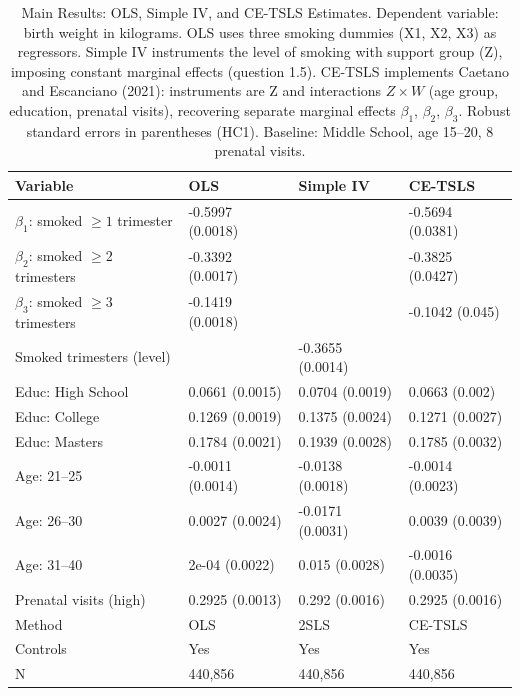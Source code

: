 \begin{table}[ht]
\centering
\caption{Main Results: OLS, Simple IV, and CE-TSLS Estimates. Dependent variable: birth weight in kilograms. OLS uses three smoking dummies (X1, X2, X3) as regressors. Simple IV instruments the level of smoking with support group (Z), imposing constant marginal effects (question 1.5). CE-TSLS implements Caetano and Escanciano (2021): instruments are Z and interactions $Z \times W$ (age group, education, prenatal visits), recovering separate marginal effects $\beta_1$, $\beta_2$, $\beta_3$. Robust standard errors in parentheses (HC1). Baseline: Middle School, age 15--20, 8 prenatal visits.} 
\label{tab:main_results}
\begin{tabular}{llll}
  \toprule
Variable & OLS & Simple IV & CE-TSLS \\ 
  \midrule
$\beta_1$: smoked $\geq 1$ trimester & -0.5997 (0.0018) &  & -0.5694 (0.0381) \\ 
  $\beta_2$: smoked $\geq 2$ trimesters & -0.3392 (0.0017) &  & -0.3825 (0.0427) \\ 
  $\beta_3$: smoked $\geq 3$ trimesters & -0.1419 (0.0018) &  & -0.1042 (0.045) \\ 
  Smoked trimesters (level) &  & -0.3655 (0.0014) &  \\ 
  Educ: High School & 0.0661 (0.0015) & 0.0704 (0.0019) & 0.0663 (0.002) \\ 
  Educ: College & 0.1269 (0.0019) & 0.1375 (0.0024) & 0.1271 (0.0027) \\ 
  Educ: Masters & 0.1784 (0.0021) & 0.1939 (0.0028) & 0.1785 (0.0032) \\ 
  Age: 21--25 & -0.0011 (0.0014) & -0.0138 (0.0018) & -0.0014 (0.0023) \\ 
  Age: 26--30 & 0.0027 (0.0024) & -0.0171 (0.0031) & 0.0039 (0.0039) \\ 
  Age: 31--40 & 2e-04 (0.0022) & 0.015 (0.0028) & -0.0016 (0.0035) \\ 
  Prenatal visits (high) & 0.2925 (0.0013) & 0.292 (0.0016) & 0.2925 (0.0016) \\ 
  Method & OLS & 2SLS & CE-TSLS \\ 
  Controls & Yes & Yes & Yes \\ 
  N & 440,856 & 440,856 & 440,856 \\ 
   \bottomrule
\end{tabular}
\end{table}
